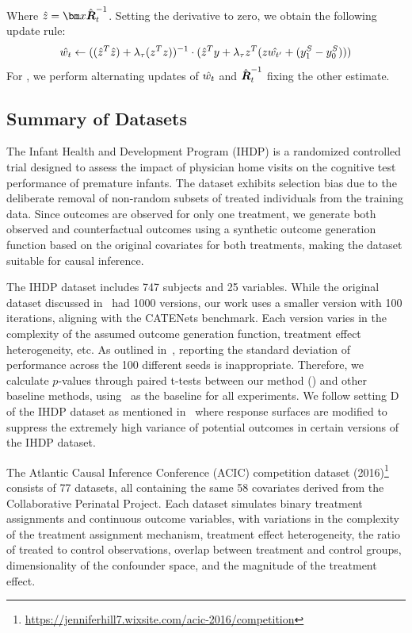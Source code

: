 Where $\hat{z} = \xb \hat{\mat{R}}^{-1}_t$. Setting the derivative to zero, we obtain the following update rule:
\begin{align*}
    \hat{w_{t}} \leftarrow ((\hat{z}^T\hat{z}) + \lambda_{\tau}(z^Tz))^{-1}\cdot (\hat{z}^Ty + \lambda_{\tau} z^T(z\hat{w_{t'}} + (y_1^S - y_0^S)))
\end{align*}
For \our, we perform alternating updates of $\hat{w_{t}}$ and $\hat{\boldsymbol{R}}^{-1}_t$ fixing the other estimate. 



\subsection{Summary of Datasets}
\label{app:datasets}

The Infant Health and Development Program (IHDP) is a randomized controlled trial designed to assess the impact of physician home visits on the cognitive test performance of premature infants. The dataset exhibits selection bias due to the deliberate removal of non-random subsets of treated individuals from the training data. Since outcomes are observed for only one treatment, we generate both observed and counterfactual outcomes using a synthetic outcome generation function based on the original covariates for both treatments, making the dataset suitable for causal inference.

The IHDP dataset includes 747 subjects and 25 variables. While the original dataset discussed in~\citep{cfrnet} had 1000 versions, our work uses a smaller version with 100 iterations, aligning with the CATENets benchmark. Each version varies in the complexity of the assumed outcome generation function, treatment effect heterogeneity, etc. As outlined in~\citep{benchmarking}, reporting the standard deviation of performance across the 100 different seeds is inappropriate. Therefore, we calculate $p$-values through paired t-tests between our method (\our) and other baseline methods, using \our\ as the baseline for all experiments. We follow setting D of the IHDP dataset as mentioned in~\citep{inducbias} where response surfaces are modified to suppress the extremely high variance of potential outcomes in certain versions of the IHDP dataset.

The Atlantic Causal Inference Conference (ACIC) competition dataset (2016)\footnote{\url{https://jenniferhill7.wixsite.com/acic-2016/competition}} consists of 77 datasets, all containing the same 58 covariates derived from the Collaborative Perinatal Project. Each dataset simulates binary treatment assignments and continuous outcome variables, with variations in the complexity of the treatment assignment mechanism, treatment effect heterogeneity, the ratio of treated to control observations, overlap between treatment and control groups, dimensionality of the confounder space, and the magnitude of the treatment effect.

